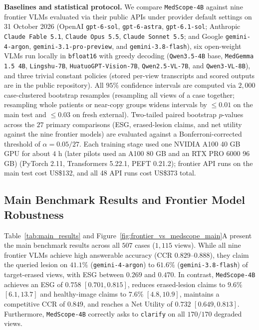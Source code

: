\documentclass{article} %
\begin{document}
\textbf{Baselines and statistical protocol.} We compare \texttt{MedScope-4B} against nine frontier VLMs evaluated via their public APIs under provider default settings on 31 October 2026 (OpenAI \texttt{gpt-6-sol}, \texttt{gpt-6-astra}, \texttt{gpt-6.1-sol}; Anthropic \texttt{Claude Fable 5.1}, \texttt{Claude Opus 5.5}, \texttt{Claude Sonnet 5.5}; and Google \texttt{gemini-4-argon}, \texttt{gemini-3.1-pro-preview}, and \texttt{gemini-3.8-flash}), six open-weight VLMs run locally in \texttt{bfloat16} with greedy decoding (\texttt{Qwen3.5-4B} base, \texttt{MedGemma 1.5 4B}, \texttt{Lingshu-7B}, \texttt{HuatuoGPT-Vision-7B}, \texttt{Qwen2.5-VL-7B}, and \texttt{Qwen3-VL-8B}), and three trivial constant policies (stored per-view transcripts and scored outputs are in the public repository). All $95\%$ confidence intervals are computed via $2,000$ case-clustered bootstrap resamples (resampling all views of a case together; resampling whole patients or near-copy groups widens intervals by $\le 0.01$ on the main test and $\le 0.03$ on fresh external). Two-tailed paired bootstrap $p$-values across the $27$ primary comparisons (ESG, erased-lesion claims, and net utility against the nine frontier models) are evaluated against a Bonferroni-corrected threshold of $\alpha = 0.05/27$. Each training stage used one NVIDIA A100 40 GB GPU for about $4\text{ h}$ (later pilots used an A100 80 GB and an RTX PRO 6000 96 GB) (PyTorch 2.11, Transformers 5.22.1, PEFT 0.21.2); frontier API runs on the main test cost US\$132, and all 48 API runs cost US\$373 total.

\subsection{Main Benchmark Results and Frontier Model Robustness}
\label{subsec:exp_main}
Table~\ref{tab:main_results} and Figure~\ref{fig:frontier_vs_medscope_main}A present the main benchmark results across all $507$ cases ($1,115$ views). While all nine frontier VLMs achieve high answerable accuracy ($\text{CCR } 0.829\text{--}0.888$), they claim the queried lesion on $41.1\%$ (\texttt{gemini-4-argon}) to $61.6\%$ (\texttt{gemini-3.8-flash}) of target-erased views, with ESG between $0.269$ and $0.470$. In contrast, \texttt{MedScope-4B} achieves an ESG of $0.758$ $[0.701, 0.815]$, reduces erased-lesion claims to $9.6\%$ $[6.1, 13.7]$ and healthy-image claims to $7.6\%$ $[4.8, 10.9]$, maintains a competitive CCR of $0.849$, and reaches a Net Utility of $0.732$ $[0.649, 0.813]$. Furthermore, \texttt{MedScope-4B} correctly asks to \texttt{clarify} on all $170/170$ degraded views.
\end{document}
